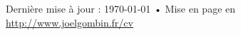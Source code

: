 \documentclass[11pt, a4paper]{article}
\begin{document}
\vfill{}

\begin{center}
{\scriptsize  Dernière mise à jour : \today\- •\- 
Mise en page en \href{http://nitens.org/taraborelli/cvtex}{
\XeTeX }\\
\href{http://www.joelgombin.fr/cv}{http://www.joelgombin.fr/cv}}
\end{center}
\end{document}
